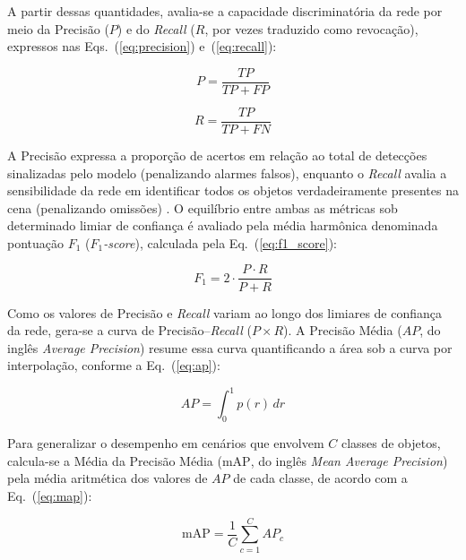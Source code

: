 A partir dessas quantidades, avalia-se a capacidade discriminatória da rede por meio da Precisão ($P$) e do \textit{Recall} ($R$, por vezes traduzido como revocação), expressos nas Eqs.~(\ref{eq:precision}) e~(\ref{eq:recall}):

\begin{equation}
P = \frac{TP}{TP + FP}
\label{eq:precision}
\end{equation}

\begin{equation}
R = \frac{TP}{TP + FN}
\label{eq:recall}
\end{equation}

\noindent A Precisão expressa a proporção de acertos em relação ao total de detecções sinalizadas pelo modelo (penalizando alarmes falsos), enquanto o \textit{Recall} avalia a sensibilidade da rede em identificar todos os objetos verdadeiramente presentes na cena (penalizando omissões) \cite{padilla2021}. O equilíbrio entre ambas as métricas sob determinado limiar de confiança é avaliado pela média harmônica denominada pontuação $F_1$ ($F_1$\textit{-score}), calculada pela Eq.~(\ref{eq:f1_score}):

\begin{equation}
F_1 = 2 \cdot \frac{P \cdot R}{P + R}
\label{eq:f1_score}
\end{equation}

Como os valores de Precisão e \textit{Recall} variam ao longo dos limiares de confiança da rede, gera-se a curva de Precisão--\textit{Recall} ($P \times R$). A Precisão Média ($AP$, do inglês \textit{Average Precision}) resume essa curva quantificando a área sob a curva por interpolação, conforme a Eq.~(\ref{eq:ap}):

\begin{equation}
AP = \int_{0}^{1} p(r) \, dr
\label{eq:ap}
\end{equation}

\noindent Para generalizar o desempenho em cenários que envolvem $C$ classes de objetos, calcula-se a Média da Precisão Média ($\text{mAP}$, do inglês \textit{Mean Average Precision}) pela média aritmética dos valores de $AP$ de cada classe, de acordo com a Eq.~(\ref{eq:map}):

\begin{equation}
\text{mAP} = \frac{1}{C} \sum_{c=1}^{C} AP_c
\label{eq:map}
\end{equation}

